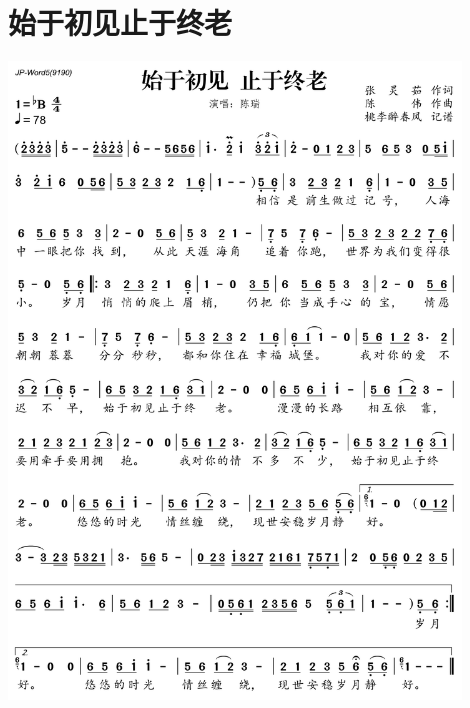 \documentclass[cn,pad,twocol]{elegantbook}
\begin{document}
\section{始于初见止于终老}\includegraphics[width=0.9\textwidth]{rpi400/20210124-始于初见止于终老.png}
\end{document}
